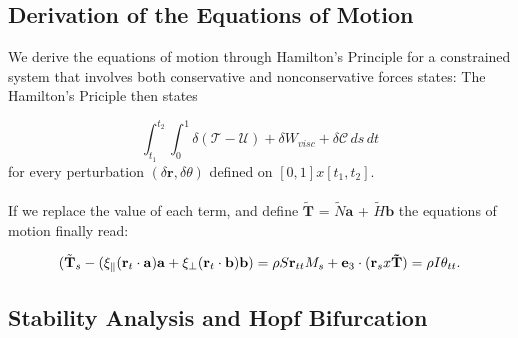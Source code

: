 \subsection{Derivation of the Equations of Motion}
We derive the equations of motion through Hamilton's Principle for a constrained system that involves both conservative and nonconservative forces states:
The Hamilton's Priciple then states

\[\int_{t_1}^{t_2} \int_{0}^{1} \delta (\mathcal{T}-\mathcal{U}) + \delta W_{visc} + \delta \mathcal{C} \, ds \,dt
\]
for every perturbation $(\delta \mathbf{r}, \delta \theta) $ defined on $[0,1]x[t_1,t_2]$. 
\\\\
If we replace the value of each term, and define $\tilde{\mathbf{T}}$ = $\tilde{N}\mathbf{a}$ + $\tilde{H}\mathbf{b}$  the equations of motion finally read:


\[ (\tilde{\mathbf{T}}_s - (\xi_\parallel (\mathbf{r}_t\cdot\mathbf{a})\mathbf{a} + \xi_\perp (\mathbf{r}_t\cdot\mathbf{b})\mathbf{b}) = \rho S \mathbf{r}_{tt}\\

M_s + \mathbf{e}_3 \cdot(\mathbf{r}_s x \mathbf{\tilde{T}}) =\rho I \theta_{tt}.
\]



\subsection{Stability Analysis and Hopf Bifurcation}
